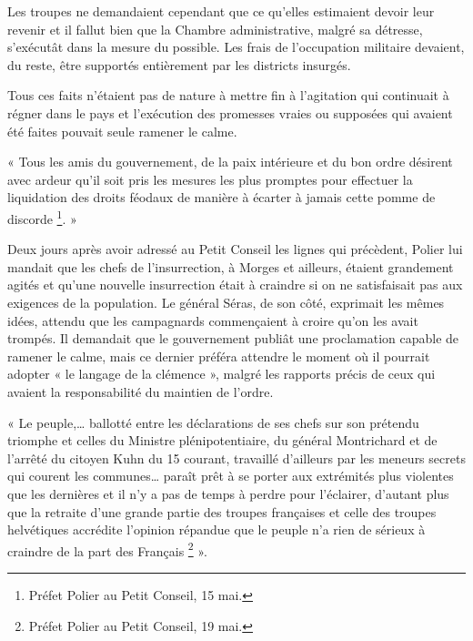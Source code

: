 \documentclass[french,twoside]{book} %
\newenvironment{quoteblock}%
  {\begin{quoting}}
  {\end{quoting}}
\newenvironment{quotebar}{%
    \def\FrameCommand{{\color{rubric!10!}\vrule width 0.5em} \hspace{0.9em}}%
    \def\OuterFrameSep{\itemsep} %
    \MakeFramed {\advance\hsize-\width \FrameRestore}
  }%
  {%
    \endMakeFramed
  }
\renewenvironment{quoteblock}%
  {%
    \savenotes
    \setstretch{0.9}
    \begin{quotebar}
  }
  {%
    \end{quotebar}
    \spewnotes
  }
\begin{document}
\noindent Les troupes ne demandaient cependant que ce qu’elles estimaient devoir leur revenir et il fallut bien que la Chambre administrative, malgré sa détresse, s’exécutât dans la mesure du possible. Les frais de l’occupation militaire devaient, du reste, être supportés entièrement par les districts insurgés.\par
Tous ces faits n’étaient pas de nature à mettre fin à l’agitation qui continuait à régner dans le pays et l’exécution des promesses vraies ou supposées qui avaient été faites pouvait seule ramener le calme.\par

\begin{quoteblock}
 \noindent « Tous les amis du gouvernement, de la paix intérieure et du bon ordre désirent avec ardeur qu’il soit pris les mesures les plus promptes pour effectuer la liquidation des droits féodaux de manière à écarter à jamais cette pomme de discorde \footnote{Préfet Polier au Petit Conseil, 15 mai.}. »
 \end{quoteblock}

\noindent Deux jours après avoir adressé au Petit Conseil les lignes qui précèdent, Polier lui mandait que les chefs de l’insurrection, à Morges et ailleurs, étaient grandement agités et qu’une nouvelle insurrection était à craindre si on ne satisfaisait pas aux exigences de la population. Le général Séras, de son côté, exprimait les mêmes idées, attendu que les campagnards commençaient à croire qu’on les avait trompés. Il demandait que le gouvernement publiât une proclamation capable de ramener le calme, mais ce dernier préféra attendre le moment où il pourrait adopter « le langage de la clémence », malgré les rapports précis de ceux qui avaient la responsabilité du maintien de l’ordre.\par

\begin{quoteblock}
 \noindent « Le peuple,… ballotté entre les déclarations de ses chefs sur son prétendu triomphe et celles du Ministre plénipotentiaire, du général Montrichard et de l’arrêté du citoyen Kuhn du 15 courant, travaillé d’ailleurs par les meneurs secrets qui courent les communes… paraît prêt à se porter aux extrémités plus violentes que les dernières et il n’y a pas de temps à perdre pour l’éclairer, d’autant plus que la retraite d’une grande partie des troupes françaises et celle des troupes helvétiques accrédite l’opinion répandue que le peuple n’a rien de sérieux à craindre de la part des Français \footnote{Préfet Polier au Petit Conseil, 19 mai.} ».
 \end{quoteblock}
\end{document}

